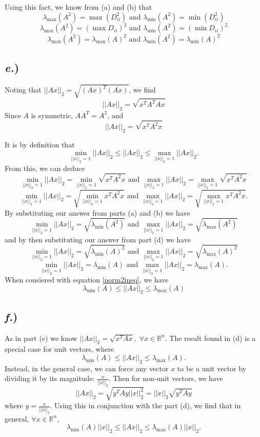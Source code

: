 \documentclass{report}
\begin{document}
Using this fact, we know from (a) and (b) that 
$$ \lambda_{\text{max}}(A^2) = \max{(D_{ii}^2)} \text{ and } \lambda_{\text{min}}(A^2) = \min{(D_{ii}^2)} $$
$$ \lambda_{\text{max}}(A^2) = (\max{D_{ii}})^2 \text{ and } \lambda_{\text{min}}(A^2) = (\min{D_{ii}})^2 $$
$$ \lambda_{\text{max}}(A^2) = \lambda_{\text{max}}(A)^2 \text{ and } \lambda_{\text{min}}(A^2) = \lambda_{\text{min}}(A)^2 $$


\subsection*{\textit{e.})}

Noting that $||Ax||_2 = \sqrt{(Ax)^T(Ax)}$, we find
$$ ||Ax||_2 = \sqrt{x^TA^TAx} $$
Since $A$ is symmetric, $AA^T = A^2$, and 
$$ ||Ax||_2 = \sqrt{x^TA^2x} $$

It is by definition that
\begin{equation}
\min_{||x||_2=1}{||Ax||_2} \leq ||Ax||_2 \leq \max_{||x||_2=1}{||Ax||_2}.
\label{norm2ineq}
\end{equation}
From this, we can deduce
$$ \min_{||x||_2=1}{||Ax||_2} = \min_{||x||_2=1}{\sqrt{x^TA^2x}} \text{ and } \max_{||x||_2=1}{||Ax||_2} = \max_{||x||_2=1}{\sqrt{x^TA^2x}} $$
$$ \min_{||x||_2=1}{||Ax||_2} = \sqrt{\min_{||x||_2=1}{x^TA^2x}} \text{ and } \max_{||x||_2=1}{||Ax||_2} = \sqrt{\max_{||x||_2=1}{x^TA^2x}}. $$
By substituting our answer from parts (a) and (b) we have
$$ \min_{||x||_2=1}{||Ax||_2} = \sqrt{\lambda_{\text{min}}(A^2)} \text{ and } \max_{||x||_2=1}{||Ax||_2} = \sqrt{\lambda_{\text{max}}(A^2)} $$
and by then substituting our answer from part (d) we have
$$ \min_{||x||_2=1}{||Ax||_2} = \sqrt{\lambda_{\text{min}}(A)^2} \text{ and } \max_{||x||_2=1}{||Ax||_2} = \sqrt{\lambda_{\text{max}}(A)^2} $$
$$ \min_{||x||_2=1}{||Ax||_2} = \lambda_{\text{min}}(A) \text{ and } \max_{||x||_2=1}{||Ax||_2} = \lambda_{\text{max}}(A). $$
When consiered with equation \ref{norm2ineq}, we have
$$ \lambda_{\text{min}}(A) \leq ||Ax||_2 \leq \lambda_{\text{max}}(A) $$

\subsection*{\textit{f.})}

As in part (e) we know $||Ax||_2 = \sqrt{x^TAx}, \; \forall x \in \mathbb{R}^n$. The result found in (d) is a special case for unit vectors, where
$$ \lambda_{\text{min}}(A) \leq ||Ax||_2 \leq \lambda_{\text{max}}(A). $$
Instead, in the general case, we can force any vector $x$ to be a unit vector by dividing it by its magnitude: $\frac{x}{||x||_2}$. Then for non-unit vectors, we have 
$$ ||Ax||_2 = \sqrt{y^TAy||x||_2^2} = ||x||_2 \sqrt{y^TAy} $$
where $y = \frac{x}{||x||_2}.$ Using this in conjunction with the part (d), we find that in general, $\forall x \in \mathbb{R}^n$,
$$ \lambda_{\text{min}}(A)||x||_2 \leq ||Ax||_2 \leq \lambda_{\text{max}}(A)||x||_2. $$
\end{document}
